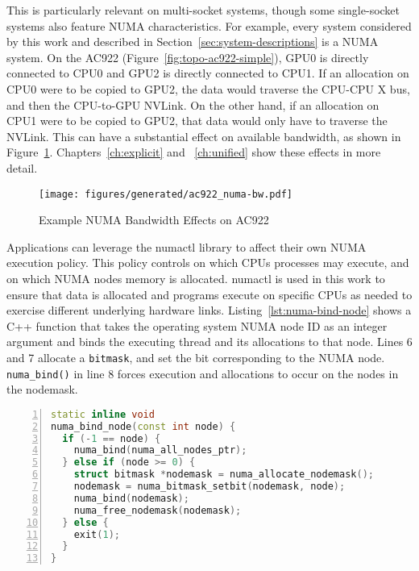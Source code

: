 This is particularly relevant on multi-socket systems, though some single-socket systems also feature NUMA characteristics.
For example, every system considered by this work and described in Section~\ref{sec:system-descriptions} is a NUMA system.
On the AC922 (Figure~\ref{fig:topo-ac922-simple}), GPU0 is directly connected to CPU0 and GPU2 is directly connected to CPU1.
If an allocation on CPU0 were to be copied to GPU2, the data would traverse the CPU-CPU X bus, and then the CPU-to-GPU NVLink.
On the other hand, if an allocation on CPU1 were to be copied to GPU2, that data would only have to traverse the NVLink.
This can have a substantial effect on available bandwidth, as shown in Figure~\ref{fig:numa-bw-example}.
Chapters~\ref{ch:explicit} and ~\ref{ch:unified} show these effects in more detail.

\begin{figure}[H]
    \centering
	\texttt{[image: figures/generated/ac922\_numa-bw.pdf]}
    \caption[Example of NUMA Bandwidth Effects on AC922]{Example NUMA Bandwidth Effects on AC922}
    \label{fig:numa-bw-example}
\end{figure}

Applications can leverage the numactl\cite{wickman2015numactl} library to affect their own NUMA execution policy.
This policy controls on which CPUs processes may execute, and on which NUMA nodes memory is allocated.
numactl is used in this work to ensure that data is allocated and programs execute on specific CPUs as needed to exercise different underlying hardware links.
Listing~\ref{lst:numa-bind-node} shows a C++ function that takes the operating system NUMA node ID as an integer argument and binds the executing thread and its allocations to that node.
Lines 6 and 7 allocate a \texttt{bitmask}, and set the bit corresponding to the NUMA node.
\texttt{numa\_bind()} in line 8 forces execution and allocations to occur on the nodes in the nodemask.

\begin{minipage}{\linewidth}
\begin{lstlisting}[language=C++, caption=Binding to NUMA nodes., label=lst:numa-bind-node, numbers=left]
static inline void 
numa_bind_node(const int node) {
  if (-1 == node) {
	numa_bind(numa_all_nodes_ptr);
  } else if (node >= 0) {
	struct bitmask *nodemask = numa_allocate_nodemask();
	nodemask = numa_bitmask_setbit(nodemask, node);
	numa_bind(nodemask);
	numa_free_nodemask(nodemask);
  } else {
	exit(1);
  }
}
\end{lstlisting}
\end{minipage}


